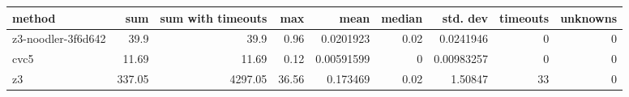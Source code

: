 \begin{tabular}{lrrrrrrrr}
\hline
 method             &    sum &   sum with timeouts &   max &       mean &   median &   std. dev &   timeouts &   unknowns \\
\hline
 z3-noodler-3f6d642 &  39.9  &               39.9  &  0.96 & 0.0201923  &     0.02 & 0.0241946  &          0 &          0 \\
 cvc5               &  11.69 &               11.69 &  0.12 & 0.00591599 &     0    & 0.00983257 &          0 &          0 \\
 z3                 & 337.05 &             4297.05 & 36.56 & 0.173469   &     0.02 & 1.50847    &         33 &          0 \\
\hline
\end{tabular}
